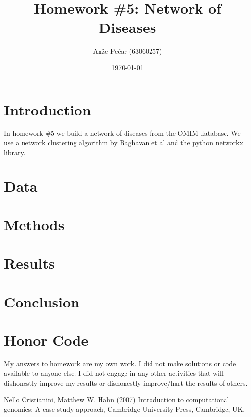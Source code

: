 \documentclass[a4paper,11pt]{article}
\title{Homework \#5: Network of Diseases}
\author{Anže Pečar (63060257)}
\date{\today}
\begin{document}
\maketitle

\section{Introduction}

In homework \#5 we build a network of diseases from the OMIM database. We use a network clustering algorithm by Raghavan et al and the python networkx library.

\section{Data}

\section{Methods}

\section{Results}

\section{Conclusion}

\section*{Honor Code}


My answers to homework are my own work. I did not make solutions or code available to anyone else. I did not engage in any other activities that will dishonestly improve my results or dishonestly improve/hurt the results of others.


\begin{thebibliography}{1}
Nello Cristianini, Matthew W. Hahn (2007) Introduction to computational genomics: A case study approach, Cambridge University Press, Cambridge, UK.


\end{thebibliography}
\end{document}
